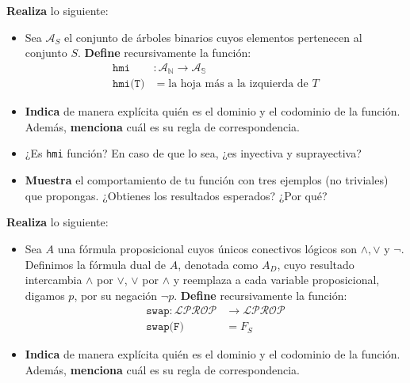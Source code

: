 \documentclass[oneside]{style}
\begin{document}
\begin{questions}[label=\protect\circled{\bfseries\arabic*}]
    \question
    {
        \textbf{Realiza} lo siguiente:
        \begin{itemize}
            \item Sea $\mathcal{A}_S$ el conjunto de árboles binarios cuyos 
            elementos pertenecen al conjunto $S$. \textbf{Define} 
            recursivamente la función:
            \begin{align*}
                \texttt{hmi}&: \mathcal{A}_\mathbb{N} \rightarrow 
                \mathcal{A}_\mathbb{S} \\ 
                \texttt{hmi(T)} &= \text{la hoja más a la izquierda de } T
            \end{align*} 

            \item \textbf{Indica} de manera explícita quién es el dominio y el 
            codominio de la función. Además, \textbf{menciona} cuál es su regla 
            de correspondencia.

            \item ¿Es \texttt{hmi} función? En caso de que lo sea, ¿es inyectiva 
            y suprayectiva?

            \item \textbf{Muestra} el comportamiento de tu función con tres 
            ejemplos (no triviales) que propongas. ¿Obtienes los resultados 
            esperados? ¿Por qué?
        \end{itemize}
    }

    \question
    {
        \textbf{Realiza} lo siguiente:
        \begin{itemize}
            \item Sea $A$ una fórmula proposicional cuyos únicos conectivos 
            lógicos son $\land, \lor$ y $\neg$. Definimos la fórmula dual de 
            $A$, denotada como $A_D$, cuyo resultado intercambia $\land$ por 
            $\lor$, $\lor$ por $\land$ y reemplaza a cada variable 
            proposicional, digamos $p$, por su negación $\neg p$. 
            \textbf{Define} recursivamente la función:
            \begin{align*}
                \texttt{swap}:\mathcal{LPROP} &\rightarrow \mathcal{LPROP} \\ 
                \texttt{swap(F)} &= F_S
            \end{align*}

            \item \textbf{Indica} de manera explícita quién es el dominio y el 
            codominio de la función. Además, \textbf{menciona} cuál es su regla 
            de correspondencia.


\end{itemize}}
\end{questions}
\end{document}
